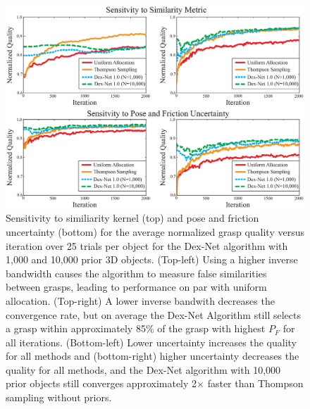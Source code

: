 \begin{figure}[t!]
\centering
\includegraphics[scale=0.22]{figures/illustrations/combined_weight_and_u_sensitivity.eps}
\caption{Sensitivity to similiarity kernel (top) and pose and friction uncertainty (bottom) for the average normalized grasp quality versus iteration over 25 trials per object for the Dex-Net algorithm with 1,000 and 10,000 prior 3D objects.
(Top-left) Using a higher inverse bandwidth causes the algorithm to measure false similarities between grasps, leading to performance on par with uniform allocation.
(Top-right) A lower inverse bandwith decreases the convergence rate, but on average the Dex-Net Algorithm still selects a grasp within approximately 85\% of the grasp with highest $P_F$ for all iterations.
(Bottom-left) Lower uncertainty increases the quality for all methods and (bottom-right) higher uncertainty decreases the quality for all methods, and the Dex-Net algorithm with 10,000 prior objects still converges approximately 2$\times$ faster than Thompson sampling without priors. 
}
\vspace*{-15pt}
\end{figure}